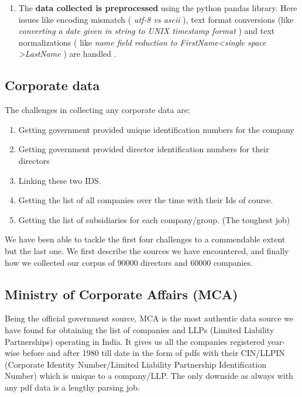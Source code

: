 \begin{enumerate}
    \item The \textbf{ data collected is preprocessed } using the python pandas library. Here issues like encoding mismatch (\emph{ utf-8 vs ascii }), text format conversions (like \emph{ converting a date given in string to UNIX timestamp format }) and text normalizations ( like \emph{ name field reduction to FirstName\textless single space \textgreater LastName }) are handled .

\end{enumerate}


\subsection{Corporate data}

The challenges in collecting any corporate data are:

\begin{enumerate}
    \item Getting government provided unique identification numbers for the company
    \item Getting government provided director identification numbers for their directors
    \item Linking these two IDS.
    \item Getting the list of all companies over the time with their Ids of course.
    \item Getting the list of subsidiaries for each company/group. (The toughest job)
\end{enumerate}  

We have been able to tackle the first four challenges to a commendable extent but the last one.  We first describe the sources we have encountered, and finally how we collected our corpus of 90000 directors and 60000 companies.



\subsection{Ministry of Corporate Affairs (MCA)} 

Being the official government source, MCA \cite{MCA} is the most authentic data source we have found for obtaining the list of companies and LLPs (Limited Liability Partnerships) operating in India. It gives us all the companies registered year-wise before and after 1980 till date in the form of pdfs with their CIN/LLPIN (Corporate Identity Number/Limited Liability Partnership Identification Number) which is unique to a company/LLP. The only downside as always with any pdf data is a lengthy parsing job.

